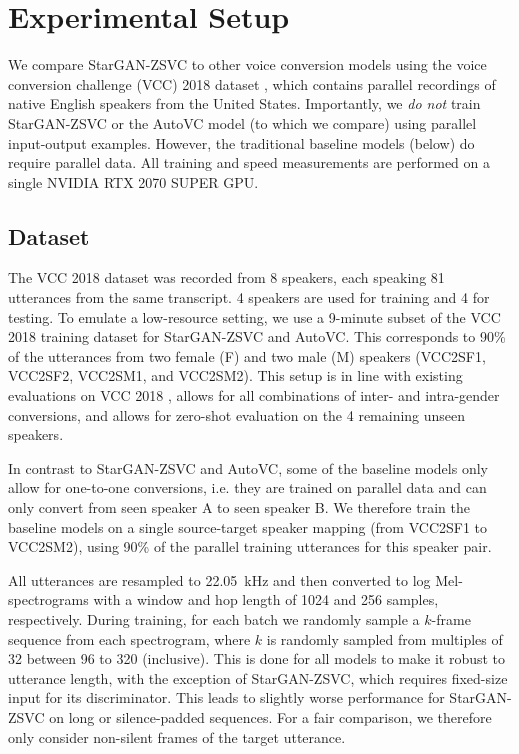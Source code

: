 

\section{Experimental Setup}

We compare StarGAN-ZSVC to other voice conversion models using the voice conversion challenge (VCC) 2018 dataset \cite{vcc2018}, which contains parallel recordings of native English speakers from the United States. 
Importantly, we \textit{do not} train StarGAN-ZSVC or the AutoVC model (to which we compare) using parallel input-output examples.
However, the traditional baseline models (below) do require parallel data.
All training and speed measurements are performed on a 
single {NVIDIA} RTX 2070 SUPER GPU. 

\subsection{Dataset}
\label{sec:dataset}
The VCC 2018 dataset was recorded from 8 speakers, each speaking 81 utterances from the same transcript. 4 speakers are used for training and 4 for testing.
To emulate a low-resource setting, we use a 9-minute subset of the VCC 2018 training dataset for StarGAN-ZSVC and AutoVC.
This corresponds to 90\% of the utterances from two female (F) and two male (M) speakers (VCC2SF1, VCC2SF2, VCC2SM1, and VCC2SM2).
This setup is in line with existing evaluations on VCC 2018 \cite{stargan-vc2}, allows for all combinations of inter- and intra-gender conversions, and allows for zero-shot evaluation on the 4 remaining unseen speakers.

In contrast to StarGAN-ZSVC and AutoVC, some of the baseline models only allow for one-to-one conversions, i.e. they are trained on parallel data and can only convert from seen speaker A to seen speaker B. 
We therefore train the baseline models on a single source-target speaker mapping (from VCC2SF1 to VCC2SM2), using 90\% of the parallel training utterances for this speaker pair.

All utterances are resampled to 22.05~kHz and then converted to log Mel-spectrograms with a window and hop length of 1024 and 256 samples, respectively. 
During training, for each batch we randomly sample a $k$-frame sequence from each spectrogram, where $k$ is randomly sampled from multiples of 32 between 96 to 320 (inclusive).
This is done for all models to make it robust to utterance length, with the exception of StarGAN-ZSVC, which requires fixed-size input for its discriminator.
This leads to slightly worse performance for
StarGAN-ZSVC on long or silence-padded sequences.
For a fair comparison, we therefore only consider non-silent frames of the target utterance.

